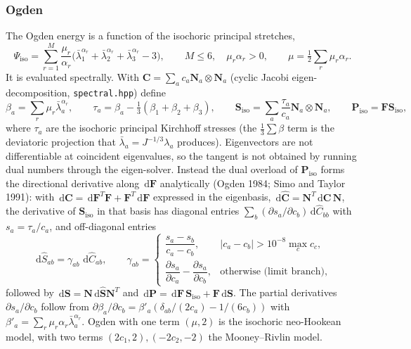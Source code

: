 \documentclass[11pt]{article}
\newcommand{\ud}{\,\mathrm{d}}
\newcommand{\bN}{\bm{N}}
\newcommand{\bP}{\bm{P}}
\newcommand{\bS}{\bm{S}}
\newcommand{\bF}{\bm{F}}
\newcommand{\bC}{\bm{C}}
\DeclareRobustCommand{\file}[1]{{\def\_{\textunderscore\allowbreak}\texttt{#1}}}
\begin{document}
\subsubsection{Ogden}
\label{sec:ogden}

The Ogden energy is a function of the isochoric principal stretches,
\begin{equation}
  \Psi_{\mathrm{iso}} = \sum_{r=1}^{M}\frac{\mu_r}{\alpha_r}
    \bigl(\bar\lambda_1^{\alpha_r} + \bar\lambda_2^{\alpha_r} + \bar\lambda_3^{\alpha_r} - 3\bigr),
  \qquad M \le 6, \quad \mu_r\alpha_r > 0, \qquad
  \mu = \tfrac12\sum_r\mu_r\alpha_r .
\end{equation}
It is evaluated spectrally.  With $\bC = \sum_a c_a\bN_a\otimes\bN_a$
(cyclic Jacobi eigen-decomposition, \file{spectral.hpp}) define
\begin{equation}
  \beta_a = \sum_r\mu_r\bar\lambda_a^{\alpha_r}, \qquad
  \tau_a = \beta_a - \tfrac13(\beta_1 + \beta_2 + \beta_3), \qquad
  \bS_{\mathrm{iso}} = \sum_a\frac{\tau_a}{c_a}\bN_a\otimes\bN_a, \qquad
  \bP_{\mathrm{iso}} = \bF\bS_{\mathrm{iso}} ,
  \label{eq:ogden}
\end{equation}
where $\tau_a$ are the isochoric principal Kirchhoff stresses (the
$\tfrac13\sum\beta$ term is the deviatoric projection that
$\bar\lambda_a = J^{-1/3}\lambda_a$ produces).  Eigenvectors are not
differentiable at coincident eigenvalues, so the tangent is not obtained by
running dual numbers through the eigen-solver.  Instead the dual overload
of $\bP_{\mathrm{iso}}$ forms the directional derivative along $\ud\bF$
analytically (Ogden 1984; Simo and Taylor 1991): with
$\ud\bC = \ud\bF^T\bF + \bF^T\ud\bF$ expressed in the eigenbasis,
$\ud\hat{\bC} = \bN^T\ud\bC\,\bN$, the derivative of $\bS_{\mathrm{iso}}$
in that basis has diagonal entries $\sum_b (\partial s_a/\partial c_b)\ud\hat C_{bb}$
with $s_a = \tau_a/c_a$, and off-diagonal entries
\begin{equation}
  \ud\hat S_{ab} = \gamma_{ab}\,\ud\hat C_{ab}, \qquad
  \gamma_{ab} = \begin{cases}
    \dfrac{s_a - s_b}{c_a - c_b}, & |c_a - c_b| > 10^{-8}\max_c c_c, \\[8pt]
    \dfrac{\partial s_a}{\partial c_a} - \dfrac{\partial s_a}{\partial c_b}, & \text{otherwise (limit branch)},
  \end{cases}
\end{equation}
followed by $\ud\bS = \bN\ud\hat{\bS}\bN^T$ and
$\ud\bP = \ud\bF\,\bS_{\mathrm{iso}} + \bF\ud\bS$.  The partial
derivatives $\partial s_a/\partial c_b$ follow from
$\partial\beta_a/\partial c_b = \beta'_a(\delta_{ab}/(2c_a) - 1/(6c_b))$
with $\beta'_a = \sum_r\mu_r\alpha_r\bar\lambda_a^{\alpha_r}$.  Ogden with
one term $(\mu, 2)$ is the isochoric neo-Hookean model, with two terms
$(2c_1, 2), (-2c_2, -2)$ the Mooney--Rivlin model.
\end{document}
